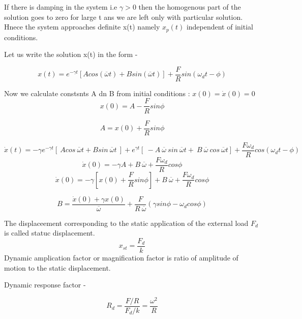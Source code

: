 \documentclass{book}
\begin{document}
\noindent
If there is damping in the system i.e \(\gamma > 0\) then the homogenous part of the solution goes 
to zero for large t ans we are left only with particular solution. Hnece the system approaches 
definite x(t) namely \(x_p(t) \) independent of initial conditions.

\noindent
Let us write the solution x(t) in the form - 
\begin{tcolorbox}[colback=pink!30!white, colframe=black, width=\textwidth, boxrule=0.5mm, sharp corners, left=1mm, right=1mm, top=1mm, bottom=1mm]
\[ x(t) =  e^{- \gamma t}[Acos(\overline{\omega} t) + B sin(\overline{\omega } t)] + \frac{F}{R} sin(\omega_d t - \phi)\]
\end{tcolorbox}

Now we calculate constsnts A dn B from initial conditions : \(x(0) = \dot{x}(0) = 0\)
\[ x(0) = A - \frac{F}{R} sin \phi \] 
\begin{tcolorbox}[colback=blue!20!white, colframe=black, width=\textwidth, boxrule=0.5mm, sharp corners, left=1mm, right=1mm, top=1mm, bottom=1mm]
\[ A = x(0) + \frac{F}{R}  sin \phi\] 
\end{tcolorbox}
\[ \dot{x}(t) =  -\gamma e^{- \gamma t}[ \ Acos\ \overline{\omega} t + B sin \ \overline{\omega } t \ ] + e^{\gamma t} [ \  - A \ \overline{\omega} \ sin \ \overline{\omega} t + \ B \ \overline{\omega} \ cos \ \overline{\omega} t] + \frac{F\omega_d}{R} cos(\omega_d t - \phi)\]
\[ \dot{x}(0) = -\gamma A + B \ \overline{\omega} + \frac{F \omega_d}{R} cos \phi\]
\[ \dot{x}(0) = -\gamma \left[ x(0) + \frac{F}{R} sin \phi \right] + B \ \overline{\omega} + \frac{F \omega_d}{R} cos \phi\]
\begin{tcolorbox}[colback=blue!20!white, colframe=black, width=\textwidth, boxrule=0.5mm, sharp corners, left=1mm, right=1mm, top=1mm, bottom=1mm]
\[ B= \frac{\dot{x}(0) + \gamma x(0)} {\overline{\omega}} + \frac{F}{R \ \overline{\omega}} (\gamma sin \phi - \omega_d cos \phi) \]
\end{tcolorbox}


The displaceement corresponding to the static application of the external load \( F_d\) is called statuc displacement.
\[ x_{st} = \frac{F_d}{k}\]
Dynamic amplication factor or magnification factor is ratio of amplitude of motion to the static displacement.

Dynamic response factor - 
\begin{tcolorbox}[colback=yellow!40!white, colframe=black, width=\textwidth, boxrule=0.5mm, sharp corners, left=1mm, right=1mm, top=1mm, bottom=1mm]
\[ R_d = \frac{ F/R}{F_d/k} = \frac{\omega^2}{R} \]
\end{tcolorbox}
\end{document}
